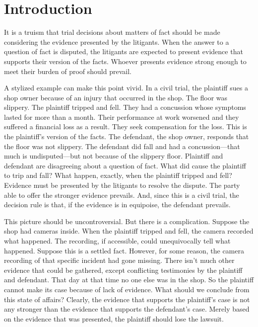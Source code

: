 \documentclass[
  10pt,
  dvipsnames,enabledeprecatedfontcommands]{scrartcl}
\begin{document}
\hypertarget{introduction}{%
\section{Introduction}\label{introduction}}

It is a truism that trial decisions about matters of fact should be made
considering the evidence presented by the litigants. When the answer to
a question of fact is disputed, the litigants are expected to present
evidence that supports their version of the facts. Whoever presents
evidence strong enough to meet their burden of proof should prevail.

A stylized example can make this point vivid. In a civil trial, the
plaintiff sues a shop owner because of an injury that occurred in the
shop. The floor was slippery. The plaintiff tripped and fell. They had a
concussion whose symptoms lasted for more than a month. Their
performance at work worsened and they suffered a financial loss as a
result. They seek compensation for the loss. This is the plaintiff's
version of the facts. The defendant, the shop owner, responds that the
floor was not slippery. The defendant did fall and had a
concussion---that much is undisputed---but not because of the slippery
floor. Plaintiff and defendant are disagreeing about a question of fact.
What did cause the plaintiff to trip and fall? What happen, exactly,
when the plaintiff tripped and fell? Evidence must be presented by the
litigants to resolve the dispute. The party able to offer the stronger
evidence prevails. And, since this is a civil trial, the decision rule
is that, if the evidence is in equipoise, the defendant prevails.

This picture should be uncontroversial. But there is a complication.
Suppose the shop had cameras inside. When the plaintiff tripped and
fell, the camera recorded what happened. The recording, if accessible,
could unequivocally tell what happened. Suppose this is a settled fact.
However, for some reason, the camera recording of that specific incident
had gone missing. There isn't much other evidence that could be
gathered, except conflicting testimonies by the plaintiff and defendant.
That day at that time no one else was in the shop. So the plaintiff
cannot make its case because of lack of evidence. What should we
conclude from this state of affairs? Clearly, the evidence that supports
the plaintiff's case is not any stronger than the evidence that supports
the defendant's case. Merely based on the evidence that was presented,
the plaintiff should lose the lawsuit.
\end{document}
